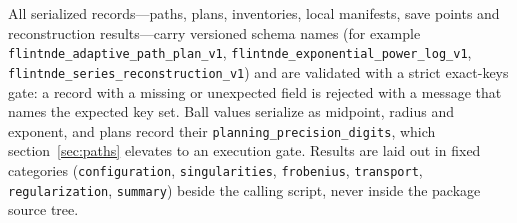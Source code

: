 \documentclass[11pt,a4paper]{article}
\begin{document}
All serialized records---paths, plans, inventories, local manifests, save points and
reconstruction results---carry versioned schema names (for example
\texttt{flintnde\_adaptive\_path\_plan\_v1},
\texttt{flintnde\_exponential\_power\_log\_v1},
\texttt{flintnde\_series\_reconstruction\_v1}) and are validated with a strict
exact-keys gate: a record with a missing or unexpected field is rejected with a message
that names the expected key set. Ball values serialize as midpoint, radius and exponent,
and plans record their \texttt{planning\_precision\_digits}, which
section~\ref{sec:paths} elevates to an execution gate. Results are laid out in fixed
categories (\texttt{configuration}, \texttt{singularities}, \texttt{frobenius},
\texttt{transport}, \texttt{regularization}, \texttt{summary}) beside the calling script,
never inside the package source tree.



\end{document}
